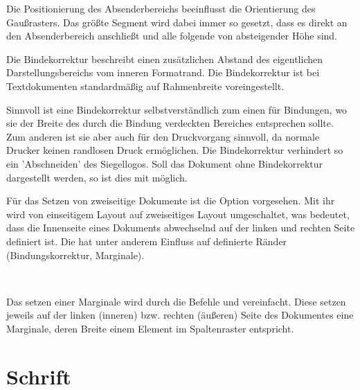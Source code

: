 \begin{important}
  Die Positionierung des Absenderbereichs beeinflusst die Orientierung des
  Gaußrasters. Das größte Segment wird dabei immer so gesetzt, dass es direkt
  an den Absenderbereich anschließt und alle folgende von absteigender Höhe sind.
\end{important}



\begin{Declaration}
\end{Declaration}

Die Bindekorrektur beschreibt einen zusätzlichen Abstand des eigentlichen
Darstellungsbereichs vom inneren Formatrand. Die Bindekorrektur
ist bei Textdokumenten standardmäßig auf Rahmenbreite voreingestellt.

Sinnvoll ist eine Bindekorrektur selbstverständlich zum einen für Bindungen,
wo sie der Breite des durch die Bindung verdeckten Bereiches entsprechen sollte.
Zum anderen ist sie aber auch für den Druckvorgang sinnvoll, da normale Drucker
keinen randlosen Druck ermöglichen. Die Bindekorrektur verhindert so \zB ein 'Abschneiden' des Siegellogos.
Soll das Dokument ohne Bindekorrektur dargestellt werden, so ist dies
mit  möglich.

\begin{Declaration}
\end{Declaration}

Für das Setzen von zweiseitige Dokumente ist die Option 
vorgesehen. Mit ihr wird von einseitigem Layout auf zweiseitiges Layout
umgeschaltet, was bedeutet, dass die Innenseite eines Dokuments abwechselnd
auf der linken und rechten Seite definiert ist. Die hat unter anderem Einfluss
auf definierte Ränder (Bindungskorrektur, Marginale).


\begin{Declaration}
  \\
\end{Declaration}

Das setzen einer Marginale wird durch die Befehle  und
 vereinfacht. Diese setzen jeweils auf der linken (inneren)
bzw. rechten (äußeren) Seite des Dokumentes eine Marginale, deren Breite
einem Element im Spaltenraster entspricht.


\section{Schrift}

